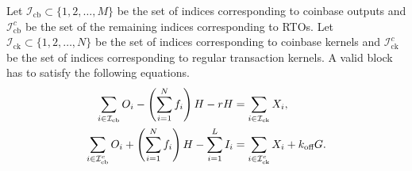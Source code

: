 %
Let $\mathcal{I}_{\text{cb}} \subset \{1,2,\ldots,M\}$ be the set of indices corresponding to coinbase outputs and $\mathcal{I}_{\text{cb}}^c$ be the set of the remaining indices corresponding to RTOs. Let $\mathcal{I}_{\text{ck}} \subset \{1,2,\ldots,N\}$ be the set of indices corresponding to coinbase kernels and $\mathcal{I}_{\text{ck}}^c$ be the set of indices corresponding to regular transaction kernels. A valid block has to satisfy the following equations.
\begin{align}
  \sum_{i \in \mathcal{I}_{\text{cb}}} O_i - \left(\sum_{i=1}^{N}f_i\right)H - r H & = \sum_{i \in \mathcal{I}_{\text{ck}}} X_i,\\
  \sum_{i \in \mathcal{I}_{\text{cb}}^c} O_i + \left(\sum_{i=1}^{N}f_i\right)H - \sum_{i=1}^{L} I_i & = \sum_{i \in \mathcal{I}_{\text{ck}}^c} X_i + k_{\textnormal{off}}G.
  \label{eqn:BlockValidity}
\end{align}
